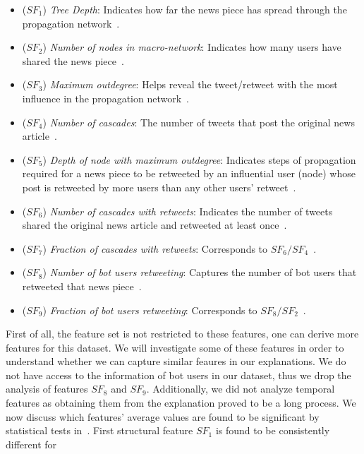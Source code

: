 \begin{itemize}
    \item ($SF_1$) \emph{Tree Depth}: Indicates how far the news piece has spread through the propagation network~\parencite{HierarchicalPropagationNetworksForFND_Shu}.
    \item ($SF_2$) \emph{Number of nodes in macro-network}: Indicates how many users have shared the news piece~\parencite{HierarchicalPropagationNetworksForFND_Shu}.
    \item ($SF_3$) \emph{Maximum outdegree}: Helps reveal the tweet/retweet with the most influence in the propagation network~\parencite{HierarchicalPropagationNetworksForFND_Shu}.
    \item ($SF_4$) \emph{Number of cascades}: The number of tweets that post the original news article~\parencite{HierarchicalPropagationNetworksForFND_Shu}.
    \item ($SF_5$) \emph{Depth of node with maximum outdegree}: Indicates steps of propagation required for a news piece to be retweeted by an influential user (node) whose post is retweeted by more users than any other users' retweet~\parencite{HierarchicalPropagationNetworksForFND_Shu}.
    \item ($SF_6$) \emph{Number of cascades with retweets}: Indicates the number of tweets shared the original news article and retweeted at least once~\parencite{HierarchicalPropagationNetworksForFND_Shu}.
    \item ($SF_7$) \emph{Fraction of cascades with retweets}: Corresponds to $SF_6 / SF_4$~\parencite{HierarchicalPropagationNetworksForFND_Shu}.
    \item ($SF_8$) \emph{Number of bot users retweeting}: Captures the number of bot users that retweeted that news piece~\parencite{HierarchicalPropagationNetworksForFND_Shu}.
    \item ($SF_9$) \emph{Fraction of bot users retweeting}: Corresponds to $SF_8 / SF_2$~\parencite{HierarchicalPropagationNetworksForFND_Shu}.
\end{itemize}
First of all, the feature set is not restricted to these features, one can derive more features for this dataset. We
will investigate some of these features in order to understand whether we can capture similar feaures in our explanations.
We do not have access to the information of bot users in our dataset, thus we drop the analysis of features $SF_8$ and $SF_9$. Additionally, we did not analyze temporal features as obtaining them from the explanation proved to be a long process. We now discuss which features' average values are found to be significant by statistical tests in~\parencite{HierarchicalPropagationNetworksForFND_Shu}. First structural feature $SF_1$ is found to be consistently different for
